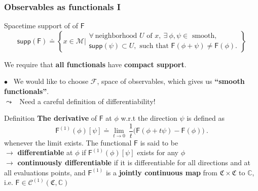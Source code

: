 \documentclass[9pt]{beamer}
\newcommand{\supp}{\mathsf{supp}}
\newcommand{\Ccal}{\mathcal{C}}
\newcommand{\Fcal}{\mathcal{F}}
\newcommand{\Mcal}{\mathcal{M}}
\newcommand{\Cbb}{\mathbb{C}}
\newcommand{\Crak}{\mathfrak{C}}
\newcommand{\Fsf}{\mathsf{F}}
\begin{document}

\begin{frame}

\frametitle{Observables as functionals I}

\begin{block}{Spacetime support of of $\Fsf$}
%
\vspace*{-8pt}
%
\begin{equation*}
\supp(\Fsf) \doteq \left\{ x \in \Mcal \bigg| 
\begin{array}{l} 
\forall \ \mbox{neighborhood } U \mbox{ of } x, \ \exists \ \phi, \psi \in \mbox{ smooth}, \\
\supp(\psi) \subset U, \mbox{ such that } \Fsf(\phi + \psi) \neq \Fsf(\phi).
\end{array}
\right\}
\end{equation*}
%
\end{block}


We require that \textbf{all functionals} have \textbf{compact support}.

\vfill

$\bullet$ \ We would like to choose $\Fcal$, space of observables, which gives us \textbf{``smooth functionals''}. \\
\qquad $\leadsto$ \ Need a careful definition of differentiability!

\vfill

\begin{block}{Definition}
\textbf{The derivative} of $\Fsf$ at $\phi$ w.r.t the direction $\psi$ is defined as 
\begin{equation*}%
\Fsf^{(1)}(\phi)[\psi] \doteq \lim_{t \to 0} \ \frac{1}{t} \bigg( \Fsf(\phi + t \psi) - \Fsf(\phi) \bigg) \ .
\end{equation*}
whenever the limit exists. The functional $\Fsf$ is said to be  \\
\quad $\to$ \textbf{differentiable} at $\phi$ if $\Fsf^{(1)}(\phi)[\psi]$ exists for any $\phi$ \\
\quad $\to$ \textbf{continuously differentiable} if it is differentiable for all directions and at all evaluations points, and $\Fsf^{(1)}$ is a \textbf{jointly continuous map} from $\Crak \times \Crak$ to $\Cbb$, i.e. $\Fsf \in \Ccal^{(1)}(\Crak,\Cbb)$
\end{block}

\vfill

\end{frame}
\end{document}
